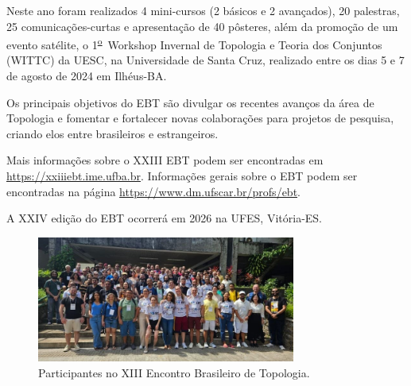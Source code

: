 \documentclass{hipatia}
\newcommand{\superou}{\textsuperscript{\underline{o}}~}
\begin{document}
Neste ano foram realizados 4 mini-cursos (2 básicos e 2 avançados), 20 palestras, 25 comunicações-curtas e apresentação de 40 pôsteres, além da promoção de um evento satélite, o 1\superou Workshop Invernal de Topologia e Teoria dos Conjuntos (WITTC) da UESC, na Universidade de Santa Cruz, realizado entre os dias 5 e 7 de agosto de 2024 em Ilhéus-BA.

Os principais objetivos do EBT são divulgar os recentes avanços da área de Topologia e fomentar e fortalecer novas colaborações para projetos de pesquisa, criando elos entre brasileiros e estrangeiros.

Mais informações sobre o XXIII EBT podem ser encontradas em \href{https://xxiiiebt.ime.ufba.br}{https://xxiiiebt.ime.ufba.br}.
Informações gerais sobre o EBT podem ser encontradas na página  \href{https://www.dm.ufscar.br/profs/ebt/about.php}{https://www.dm.ufscar.br/profs/ebt}.

A XXIV edição do EBT ocorrerá em 2026 na UFES, Vitória-ES.

\begin{figure}[htb]
    \centering
    \includegraphics[width=8.5cm]{EBT.jpeg}
    \caption{Participantes no XIII Encontro Brasileiro de Topologia.}
 \label{EBT}
\end{figure}

\end{document}
